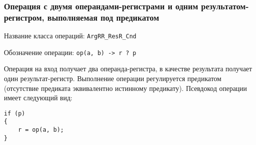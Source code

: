 \documentclass[a4paper,12pt]{extarticle}                     %
\numberwithin{equation}{section}                             %
\numberwithin{figure}{section}                               %
\numberwithin{table}{section}                                %
\theoremstyle{plain}                                         %
\numberwithin{theorem}{section}                              %
\numberwithin{lemma}{section}                                %
\numberwithin{definition}{section}                           %
\begin{document}
\newpage

\subsubsection{Операция с двумя операндами-регистрами и одним результатом-регистром, выполняемая под предикатом}

Название класса операций: \texttt{ArgRR\_ResR\_Cnd}

Обозначение операции: \texttt{op(a, b) -> r ? p}

Операция на вход получает два операнда-регистра, в качестве результата получает один результат-регистр. Выполнение операции регулируется предикатом (отсутствие предиката эквивалентно истинному предикату). Псевдокод операции имеет следующий вид:

\begin{lstlisting}[caption={Псевдокод операции ArgRR\_ResR\_Cnd.}]
if (p)
{
    r = op(a, b);
}

\end{lstlisting}

\
\end{document}
